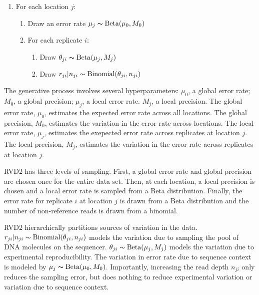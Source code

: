 \documentclass{bioinfo}
\begin{document}
\begin{enumerate}[noitemsep]
	\item For each location $j$:
	\begin{enumerate}
		\item Draw an error rate $\mu_j \thicksim \text{Beta}(\mu_0, M_0)$
		\item For each replicate $i$:
		\begin{enumerate}
			\item Draw $\theta_{ji} \thicksim \text{Beta}(\mu_j, M_j)$
			\item Draw $r_{ji} | n_{ji} \thicksim \text{Binomial}(\theta_{ji}, n_{ji})$
		\end{enumerate}
	\end{enumerate}
\end{enumerate}


The generative process involves several hyperparameters: $\mu_0$, a global error rate; $M_0$, a global precision;  $ \mu_j $, a local error rate. $M_j$, a local precision. The global error rate, $\mu_0$, estimates the expected error rate across all locations. The global precision, $M_0$, estimates the variation in the error rate  across locations. The local error rate, $ \mu_j $, estimates the exepected error rate across replicates at location $ j $. The local precision, $M_j$, estimates the variation in the error rate across replicates at location $j$.

RVD2 has three levels of sampling. First, a global error rate and global precision are chosen once for the entire data set. Then, at each location, a local precision is chosen and a local error rate is sampled from a Beta distribution. Finally, the error rate for replicate $i$ at location $j$ is drawn from a Beta distribution and the number of non-reference reads is drawn from a binomial.

RVD2 hierarchically partitions sources of variation in the data. $r_{ji} | n_{ji} \thicksim \text{Binomial}(\theta_{ji}, n_{ji})$ models the variation due to sampling the pool of DNA molecules on the sequencer. $\theta_{ji} \thicksim \text{Beta}(\mu_j, M_j)$ models the variation due to experimental reproducibility. The variation in error rate due to sequence context is modeled by $\mu_j \thicksim \text{Beta}(\mu_0, M_0)$. Importantly, increasing the read depth $n_{ji}$ only reduces the sampling error, but does nothing to reduce experimental variation or variation due to sequence context.
\end{document}
